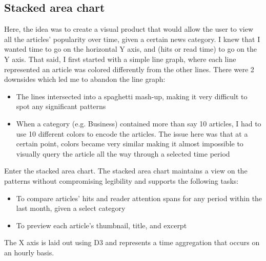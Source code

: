 \documentclass[12pt]{article}
\begin{document}
\subsection{Stacked area chart}

Here, the idea was to create a visual product that would allow the user to view all the articles' popularity over time, given a certain news category. I knew that I wanted time to go on the horizontal Y axis, and (hits or read time) to go on the Y axis. That said, I first started with a simple line graph, where each line represented an article was colored differently from the other lines. There were 2 downsides which led me to abandon the line graph: 
\begin{itemize}
\item The lines intersected into a spaghetti mash-up, making it very difficult to spot any significant patterns
\item When a category (e.g. Business) contained more than say 10 articles, I had to use 10 different colors to encode the articles. The issue here was that at a certain point, colors became very similar making it almost impossible to visually query the article all the way through a selected time period 
\end{itemize}

\noindent Enter the stacked area chart. The stacked area chart maintains a view on the patterns without compromising legibility and supports the following tasks: 
\begin{itemize}
\item To compare articles' hits and reader attention spans for any period within the last month, given a select category
\item To preview each article's thumbnail, title, and excerpt
\end{itemize}

\noindent The X axis is laid out using D3 and represents a time aggregation that occurs on an hourly basis. 
\end{document}
